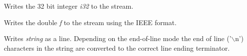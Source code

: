 Writes the 32 bit integer {\it i32} to the stream.


\label{wxtextoutputstreamwritedouble}


Writes the double {\it f} to the stream using the IEEE format.


\label{wxtextoutputstreamwritestring}


Writes {\it string} as a line. Depending on the end-of-line mode the end of
line ('$\backslash$n') characters in the string are converted to the correct
line ending terminator.

